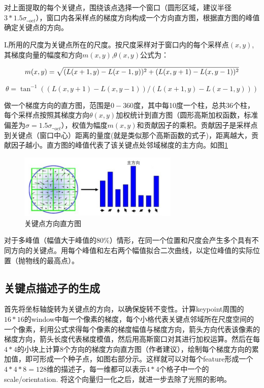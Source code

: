 \documentclass[12pt]{article}
\numberwithin{equation}{section}%
\begin{document}
对上面提取的每个关键点，围绕该点选择一个窗口（圆形区域，建议半径$3*1.5\sigma\_ _{oct}$），窗口内各采样点的梯度方向构成一个方向直方图，根据直方图的峰值确定关键点的方向。

L所用的尺度为关键点所在的尺度。按尺度采样对于窗口内的每个采样点$(x,y)$,其梯度向量的幅度和方向$m(x,y)$,$\theta(x,y)$公式为：

\begin{equation}
m(x,y)=\sqrt{(L(x+1,y)-L(x-1,y))^{2}+(L(x,y+1)-L(x,y-1))^{2}}\\
\end{equation}

\begin{equation}
\theta =\tan^{-1}((L(x,y+1)-L(x,y-1))/(L(x+1,y)-L(x-1,y)))
\end{equation}

做一个梯度方向的直方图，范围是$0-360$度，其中每10度一个柱，总共36个柱，每个采样点按照其梯度方向$\theta(x,y)$加权统计到直方图（圆形高斯加权函数，标准偏差为$\sigma=1.5\sigma\_ _{oct}$），权值为幅度$m(x,y)$和贡献因子的乘积。贡献因子是采样点到关键点（窗口中心）距离的量度(就是类似那个高斯函数的式子)，距离越大，贡献因子越小。直方图的峰值代表了该关键点处邻域梯度的主方向。如图\ref{fangxiang}
\begin{figure}[!ht]
  \centering\includegraphics[width=3in]{guanjiandian_fangxiang_zhifangtu.png}
  \caption{关键点方向直方图}
 \label{fangxiang}
  \end{figure}

对于多峰值（幅值大于峰值的80\%）情形，在同一个位置和尺度会产生多个具有不同方向的关键点。用每个峰值和左右两个幅值拟合二次曲线，以定位峰值的实际位置（抛物线的最高点）。

\subsection{关键点描述子的生成}
首先将坐标轴旋转为关键点的方向，以确保旋转不变性。计算keypoint周围的$16*16$的window中每一个像素的梯度，每个小格代表关键点邻域所在尺度空间的一个像素，利用公式求得每个像素的梯度幅值与梯度方向，箭头方向代表该像素的梯度方向，箭头长度代表梯度模值，然后用高斯窗口对其进行加权运算。然后在每$4*4$的小块上计算8个方向的梯度方向直方图（作者建议），绘制每个梯度方向的累加值，即可形成一个种子点，如图右部分示。这样就可以对每个feature形成一个$4*4*8=128$维的描述子，每一维都可以表示$4*4$个格子中一个的scale/orientation. 将这个向量归一化之后，就进一步去除了光照的影响。
\end{document}

